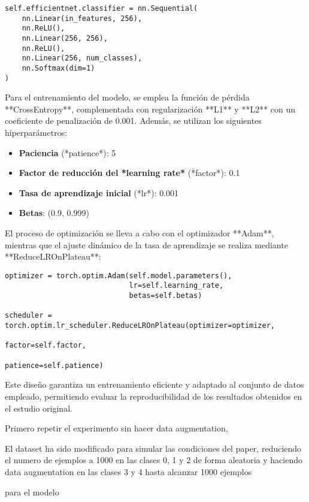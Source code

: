 \documentclass[11pt,spanish,listoffigures,listoftables]{tfgetsinf}
\begin{document}
\begin{verbatim}
self.efficientnet.classifier = nn.Sequential(
    nn.Linear(in_features, 256),
    nn.ReLU(),
    nn.Linear(256, 256),
    nn.ReLU(),
    nn.Linear(256, num_classes),
    nn.Softmax(dim=1)
)
\end{verbatim}

Para el entrenamiento del modelo, se emplea la función de pérdida **CrossEntropy**, complementada con regularización **L1** y **L2** con un coeficiente de penalización de 0.001. Además, se utilizan los siguientes hiperparámetros:

\begin{itemize}
    \item \textbf{Paciencia} (*patience*): 5
    \item \textbf{Factor de reducción del *learning rate*} (*factor*): 0.1
    \item \textbf{Tasa de aprendizaje inicial} (*lr*): 0.001
    \item \textbf{Betas}: (0.9, 0.999)
\end{itemize}

El proceso de optimización se lleva a cabo con el optimizador **Adam**, mientras que el ajuste dinámico de la tasa de aprendizaje se realiza mediante **ReduceLROnPlateau**:

\begin{verbatim}
optimizer = torch.optim.Adam(self.model.parameters(),
                             lr=self.learning_rate,
                             betas=self.betas)

scheduler = torch.optim.lr_scheduler.ReduceLROnPlateau(optimizer=optimizer,
                                                       factor=self.factor,
                                                       patience=self.patience)
\end{verbatim}

Este diseño garantiza un entrenamiento eficiente y adaptado al conjunto de datos empleado, permitiendo evaluar la reproducibilidad de los resultados obtenidos en el estudio original.




Primero repetir el experimento sin hacer data augmentation,

El dataset \cite{chen2018knee} ha sido modificado para simular las condiciones del paper, reduciendo el numero de ejemplos a 1000 en las clases 0, 1 y 2 de forma aleatoria y haciendo data augmentation en las clases 3 y 4 hasta alcanzar 1000 ejemplos


para el modelo 
\end{document}
